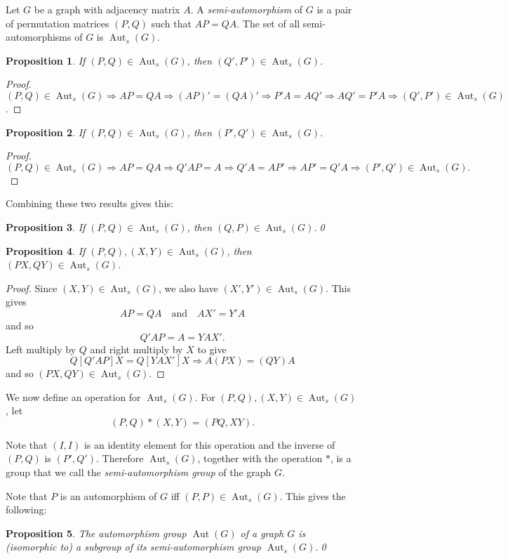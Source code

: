 \documentclass[12pt]{article}
\DeclareMathOperator{\Aut}{Aut}
\newcommand{\Auts}{\Aut_s}
\newtheorem{prop}{Proposition}
\begin{document}
\vskip 0.5in

Let $G$ be a graph with adjacency matrix $A$. A
\emph{semi-automorphism} of $G$ is a pair of permutation matrices
$(P,Q)$ such that $AP=QA$. The set of all semi-automorphisms of $G$ is
$\Auts(G)$.

\begin{prop}
  If $(P,Q)\in\Auts(G)$, then $(Q',P')\in\Auts(G)$.
\end{prop}
\begin{proof}
  $(P,Q)\in\Auts(G) \Rightarrow AP=QA \Rightarrow (AP)'=(QA)'
  \Rightarrow P'A = A Q' \Rightarrow AQ'=P'A \Rightarrow (
  Q',P')\in\Auts(G)$.
\end{proof}


\begin{prop}
  If $(P,Q) \in \Auts(G)$, then $(P',Q') \in \Auts(G)$.
\end{prop}

\begin{proof}
  $(P,Q) \in \Auts(G) \Rightarrow AP=QA \Rightarrow Q'AP=A \Rightarrow
  Q'A=AP' \Rightarrow AP'=Q'A \Rightarrow (P',Q') \in \Auts(G).$
\end{proof}

Combining these two results gives this:
\begin{prop}
  If $(P,Q) \in \Auts(G)$, then $(Q,P) \in \Auts(G)$.\qed
\end{prop}


\begin{prop}
  If $(P,Q), (X,Y) \in \Auts(G)$, then $(PX,QY)\in\Auts(G)$.
\end{prop}

\begin{proof}
  Since $(X,Y)\in\Auts(G)$, we also have $(X',Y')\in\Auts(G)$. This
  gives
  \[
  AP=QA \quad\text{and}\quad AX'=Y'A 
  \] 
  and so 
  \[
  Q'AP = A = YAX'.
  \]
  Left multiply by $Q$ and right multiply by $X$ to give 
  \[
  Q[Q'AP]X = Q[YAX']X \Rightarrow A(PX) = (QY)A     
  \]
  and so $(PX,QY)\in\Auts(G)$.
\end{proof}

We now define an operation for $\Auts(G)$. For $(P,Q), (X,Y) \in
\Auts(G)$, let
\[
(P,Q) * (X,Y) = (PQ,XY).    
\]

Note that $(I,I)$ is an identity element for this operation and the
inverse of $(P,Q)$ is $(P',Q')$. Therefore $\Auts(G)$, together with
the operation $*$, is a group that we call the \emph{semi-automorphism
  group} of the graph $G$.

Note that $P$ is an automorphism of $G$ iff $(P,P) \in \Auts(G)$. This
gives the following:
\begin{prop}
  The automorphism group $\Aut(G)$ of a graph $G$ is (isomorphic to) a
  subgroup of its semi-automorphism group $\Auts(G)$.\qed
\end{prop}
\end{document}
